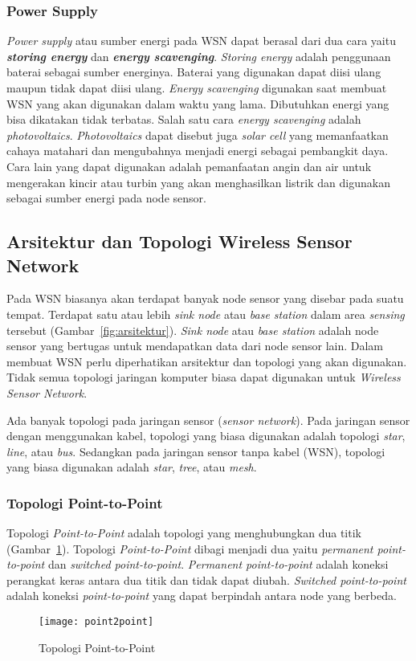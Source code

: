 \subsubsection{Power Supply}
\textit{Power supply} atau sumber energi pada WSN dapat berasal dari dua cara yaitu \textbf{\textit{storing energy}} dan \textbf{\textit{energy scavenging}}. \textit{Storing energy} adalah penggunaan baterai sebagai sumber energinya. Baterai yang digunakan dapat diisi ulang maupun tidak dapat diisi ulang. \textit{Energy scavenging} digunakan saat membuat WSN yang akan digunakan dalam waktu yang lama. Dibutuhkan energi yang bisa dikatakan tidak terbatas. Salah satu cara \textit{energy scavenging} adalah \textit{photovoltaics}. \textit{Photovoltaics} dapat disebut juga \textit{solar cell} yang memanfaatkan cahaya matahari dan mengubahnya menjadi energi sebagai pembangkit daya. Cara lain yang dapat digunakan adalah pemanfaatan angin dan air untuk mengerakan kincir atau turbin yang akan menghasilkan listrik dan digunakan sebagai sumber energi pada node sensor.
\subsection{Arsitektur dan Topologi Wireless Sensor Network \cite{sensor_technologies:0:sensor_technologies} \cite{overview:0:wireless}}
Pada WSN biasanya akan terdapat banyak node sensor yang disebar pada suatu tempat. Terdapat satu atau lebih \textit{sink node} atau \textit{base station} dalam area \textit{sensing} tersebut (Gambar~\ref{fig:arsitektur}). \textit{Sink node} atau \textit{base station} adalah node sensor yang bertugas untuk mendapatkan data dari node sensor lain. Dalam membuat WSN perlu diperhatikan arsitektur dan topologi yang akan digunakan. Tidak semua topologi jaringan komputer biasa dapat digunakan untuk \textit{Wireless Sensor Network}. 

Ada banyak topologi pada jaringan sensor (\textit{sensor network}). Pada jaringan sensor dengan menggunakan kabel, topologi yang biasa digunakan adalah topologi \textit{star}, \textit{line}, atau \textit{bus}. Sedangkan pada jaringan sensor tanpa kabel (WSN), topologi yang biasa digunakan adalah \textit{star}, \textit{tree}, atau \textit{mesh}. 

\subsubsection{Topologi Point-to-Point}
Topologi \textit{Point-to-Point} adalah topologi yang menghubungkan dua titik (Gambar~\ref{fig:point2point}). Topologi \textit{Point-to-Point} dibagi menjadi dua yaitu \textit{permanent point-to-point} dan \textit{switched point-to-point}. \textit{Permanent point-to-point} adalah koneksi perangkat keras antara dua titik dan tidak dapat diubah. \textit{Switched point-to-point} adalah koneksi \textit{point-to-point} yang dapat berpindah antara node yang berbeda. 
\begin{figure} [H]
	\centering  
	\texttt{[image: point2point]}  
	\caption[Topologi Point-to-Point]{Topologi Point-to-Point} 
	\label{fig:point2point} 
\end{figure} 

